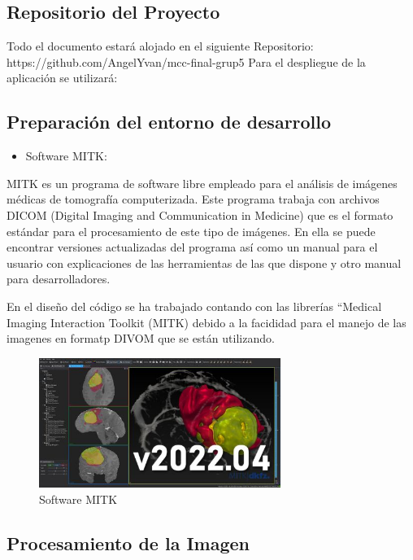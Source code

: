 \documentclass{article}
\begin{document}
\subsection{Repositorio del Proyecto}

Todo el documento estará alojado en el siguiente Repositorio: https://github.com/AngelYvan/mcc-final-grup5
Para el despliegue de la aplicación se utilizará: 

\subsection{Preparación del entorno de desarrollo}


\begin{itemize}
            \item Software MITK:
\end{itemize}

MITK es un programa de software libre empleado para el análisis de imágenes médicas de
tomografía computerizada. Este programa trabaja con archivos DICOM (Digital Imaging and
Communication in Medicine) que es el formato estándar para el procesamiento de este tipo de
imágenes. En ella se puede encontrar versiones actualizadas del programa así como un manual para el usuario con explicaciones de las herramientas de las que dispone y otro manual para desarrolladores.

En el diseño del código se ha trabajado contando con las librerías “Medical Imaging Interaction Toolkit (MITK) debido a la facididad para el manejo de las imagenes en formatp DIVOM que se están utilizando.

\begin{figure}[H]
\centering
\includegraphics[width=0.7\textwidth]{img/MITK.jpg}
\caption{Software MITK}
\end{figure}

\subsection{Procesamiento de la Imagen}
\end{document}
